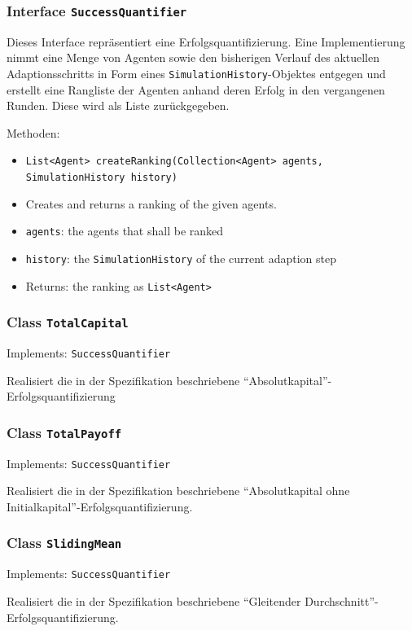 \documentclass[parskip=full,11pt]{scrartcl}
\begin{document}
\subsubsection{Interface \texttt{SuccessQuantifier}}
Dieses Interface repräsentiert eine Erfolgsquantifizierung. Eine Implementierung nimmt eine Menge von Agenten sowie den bisherigen Verlauf des aktuellen Adaptionsschritts in Form eines \texttt{SimulationHistory}-Objektes entgegen und erstellt eine Rangliste der Agenten anhand deren Erfolg in den vergangenen Runden. Diese wird als Liste zurückgegeben.

Methoden:
\begin{itemize}\itemsep -10pt
\item \texttt{List<Agent> createRanking(Collection<Agent> agents, SimulationHistory history)}
\item[] Creates and returns a ranking of the given agents.
\item[] \texttt{agents}: the agents that shall be ranked
\item[] \texttt{history}: the \texttt{SimulationHistory} of the current adaption step
\item[] Returns: the ranking as \texttt{List<Agent>}
\end{itemize}

\subsubsection{Class \texttt{TotalCapital}}
Implements: \texttt{SuccessQuantifier}

Realisiert die in der Spezifikation beschriebene \enquote{Absolutkapital}-Erfolgsquantifizierung

\subsubsection{Class \texttt{TotalPayoff}}
Implements: \texttt{SuccessQuantifier}

Realisiert die in der Spezifikation beschriebene \enquote{Absolutkapital ohne Initialkapital}-Erfolgsquantifizierung.

\subsubsection{Class \texttt{SlidingMean}}
Implements: \texttt{SuccessQuantifier}

Realisiert die in der Spezifikation beschriebene \enquote{Gleitender Durchschnitt}-Erfolgsquantifizierung.
\end{document}

